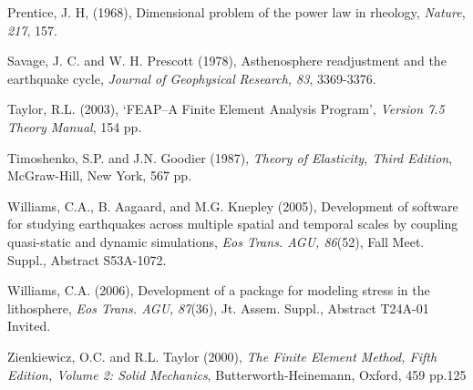 \documentclass{pylithdoc}
\begin{document}
\begin{thebibliography}{Bibliography}
Prentice, J. H, (1968), Dimensional
problem of the power law in rheology, \textit{Nature}, \textit{217},
157.

Savage,
J. C. and W. H. Prescott (1978), Asthenosphere readjustment and the
earthquake cycle, \textit{Journal of Geophysical} \textit{Research}\emph{,
83}, 3369-3376.

Taylor, R.L. (2003), `FEAP--A
Finite Element Analysis Program', \textit{Version 7.5 Theory Manual},
154 pp.

Timoshenko,
S.P. and J.N. Goodier (1987), \textit{Theory of Elasticity, Third
Edition}, McGraw-Hill, New York, 567 pp.

Williams, C.A.,
B. Aagaard, and M.G. Knepley (2005), Development of software for studying
earthquakes across multiple spatial and temporal scales by coupling
quasi-static and dynamic simulations, \emph{Eos Trans. AGU, 86}(52),
Fall Meet. Suppl., Abstract S53A-1072.

Williams, C.A. (2006), Development
of a package for modeling stress in the lithosphere, \emph{Eos Trans.
AGU,} \emph{87}(36), Jt. Assem. Suppl., Abstract T24A-01 Invited.

Zienkiewicz,
O.C. and R.L. Taylor (2000), \textit{The Finite Element Method, Fifth
Edition, Volume 2: Solid Mechanics}, Butterworth-Heinemann, Oxford,
459 pp.125\end{thebibliography}
\end{document}
